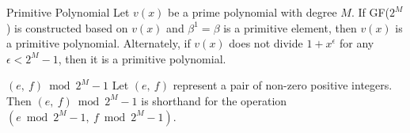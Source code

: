 \begin{definition}{Primitive Polynomial \newline}
Let $v(x)$ be a prime polynomial with degree $M$. If GF($2^M$) is constructed based on $v(x)$ and $\beta^1 = \beta$ is a primitive element, then $v(x)$ is a primitive polynomial. Alternately, if $v(x)$ does not divide $1+x^{\epsilon}$ for any $\epsilon<2^M-1$, then it is a primitive polynomial. 
\end{definition}

\begin{definition}{ $(e,~f) \bmod 2^M-1$ \newline}
Let $(e,~f)$ represent a pair of non-zero positive integers. Then $(e,~f) \bmod 2^M-1$ is shorthand for the operation $(e \bmod 2^M-1,~f \bmod 2^M-1)$.
\end{definition}








